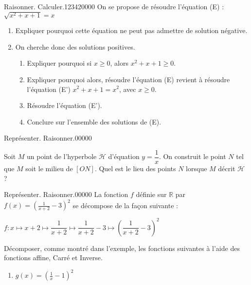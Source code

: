 %
\begin{pageParcourst}

\begin{ExoCt}{Raisonner. Calculer.}{1234}{2}{0}{0}{0}{0}
On se propose de résoudre l'équation (E) : $\sqrt{x^2+x+1}=x$
\begin{enumerate}
\item Expliquer pourquoi cette équation ne peut pas admettre de solution négative. 
\item On cherche donc des solutions positives.
\begin{enumerate}
\item Expliquer pourquoi si $x \geq 0$, alors $x^2+x+1 \geq 0$.
\item Expliquer pourquoi alors, résoudre l'équation (E) revient à résoudre l'équation (E') $x^2+x+1=x^2$, avec $x \geq 0$.
\item Résoudre l'équation (E').
\item Conclure sur l'ensemble des solutions de (E).
\end{enumerate}
\end{enumerate}
\end{ExoCt}



 
 
\begin{ExoCtN}{Représenter. Raisonner.}{0}{0}{0}{0}{0}

Soit $M$ un point de l'hyperbole $\mathcal{H}$ d'équation $y=\dfrac{1}{x}$. On construit le point $N$ tel que $M$ soit le milieu de $[ON]$. Quel est le lieu des points $N$ lorsque $M$ décrit $\mathcal{H}$ ? 

\end{ExoCtN}
 
 
 \begin{ExoCtN}{Représenter. Raisonner.}{0}{0}{0}{0}{0}
La fonction $f$ définie sur $\mathbb R$ par $f(x)=\left(\frac{1}{x+2}-3 \right)^2$ se décompose de la façon suivante :

$f:x \longmapsto  x+2 \mapsto  \dfrac{1}{x+2}   \longmapsto \dfrac{1}{x+2}-3 \longmapsto \left(\dfrac{1}{x+2}-3 \right)^2$


Décomposer, comme montré dans l'exemple, les fonctions suivantes à l'aide des fonctions affine, Carré et Inverse.
\begin{enumerate}
\item $g(x)=\left(\frac{1}{x}-1 \right)^2$ 


\end{enumerate}
\end{ExoCtN}
\end{pageParcourst}
